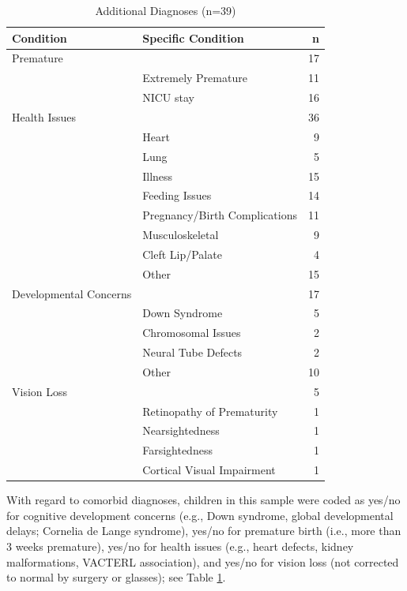 \documentclass[
  english,
  man]{apa6}
\begin{document}
\begin{longtable}[t]{l|l|r}
\caption{\label{tab:comorbid-info}Additional Diagnoses (n=39)}\\
\hline
Condition & Specific Condition & n\\
\hline
Premature &  & 17\\
\hline
 & Extremely Premature & 11\\
\hline
 & NICU stay & 16\\
\hline
Health Issues &  & 36\\
\hline
 & Heart & 9\\
\hline
 & Lung & 5\\
\hline
 & Illness & 15\\
\hline
 & Feeding Issues & 14\\
\hline
 & Pregnancy/Birth Complications & 11\\
\hline
 & Musculoskeletal & 9\\
\hline
 & Cleft Lip/Palate & 4\\
\hline
 & Other & 15\\
\hline
Developmental Concerns &  & 17\\
\hline
 & Down Syndrome & 5\\
\hline
 & Chromosomal Issues & 2\\
\hline
 & Neural Tube Defects & 2\\
\hline
 & Other & 10\\
\hline
Vision Loss &  & 5\\
\hline
 & Retinopathy of Prematurity & 1\\
\hline
 & Nearsightedness & 1\\
\hline
 & Farsightedness & 1\\
\hline
 & Cortical Visual Impairment & 1\\
\hline
\end{longtable}

With regard to comorbid diagnoses, children in this sample were coded as yes/no for cognitive development concerns (e.g., Down syndrome, global developmental delays; Cornelia de Lange syndrome), yes/no for premature birth (i.e., more than 3 weeks premature), yes/no for health issues (e.g., heart defects, kidney malformations, VACTERL association), and yes/no for vision loss (not corrected to normal by surgery or glasses); see Table \ref{tab:comorbid-info}.
\end{document}
